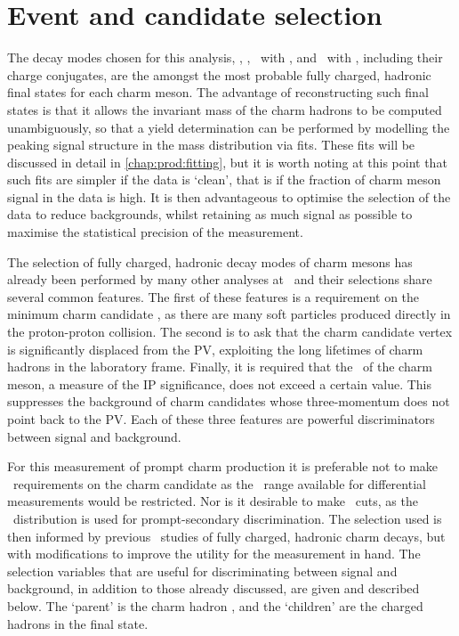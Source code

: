 \chapter{Event and candidate selection}
\label{chap:prod:sel}

The decay modes chosen for this analysis,
\DzToKpi, \DpToKpipi, \DspTophipi\ with \phiToKK, and \DstToDzpi\ with 
\DzToKpi, including their charge conjugates, are the amongst the most probable 
fully charged, hadronic final states for each charm meson.
The advantage of reconstructing such final states is that it allows the 
invariant mass of the charm hadrons to be computed unambiguously, so that a 
yield determination can be performed by modelling the peaking signal structure 
in the mass distribution via fits.
These fits will be discussed in detail in \cref{chap:prod:fitting}, but it is 
worth noting at this point that such fits are simpler if the data is `clean', 
that is if the fraction of charm meson signal in the data is high.
It is then advantageous to optimise the selection of the data to reduce 
backgrounds, whilst retaining as much signal as possible to maximise the 
statistical precision of the measurement.

The selection of fully charged, hadronic decay modes of charm mesons has 
already been performed by many other analyses at \lhcb\footnotemark\ and their 
selections share several common features.
The first of these features is a requirement on the minimum charm candidate 
\pT, as there are many soft particles produced directly in the proton-proton 
collision.
The second is to ask that the charm candidate vertex is significantly displaced 
from the \ac{PV}, exploiting the long lifetimes of charm hadrons in the 
laboratory frame.
Finally, it is required that the \ipchisq\ of the charm meson, a measure of the 
\acf{IP} significance, does not exceed a certain value.
This suppresses the background of charm candidates whose three-momentum does 
not point back to the \ac{PV}.
Each of these three features are powerful discriminators between signal and 
background.

For this measurement of prompt charm production it is preferable not to make 
\pT\ requirements on the charm candidate as the \pT\ range available for 
differential measurements would be restricted.
Nor is it desirable to make \ipchisq\ cuts, as the \ipchisq\ distribution is 
used for prompt-secondary discrimination.
The selection used is then informed by previous \lhcb\ studies of fully 
charged, hadronic charm decays, but with modifications to improve the utility 
for the measurement in hand.
The selection variables that are useful for discriminating between signal and 
background, in addition to those already discussed, are given and described 
below.
The `parent' is the charm hadron \PHc, and the `children' are the charged 
hadrons in the final state.

